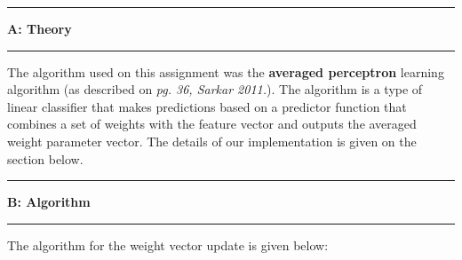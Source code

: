 \documentclass[11pt]{article}
\newcommand\question[2]{\vspace{.25in}\hrule\textbf{#1: #2}\vspace{.5em}\hrule\vspace{.10in}}
\begin{document}
\newcommand\NAME{Turash and Luiz}  %
\newcommand\ID{tmosharr \& lperesde}     %
\newcommand\HWNUM{}              %




\question{A}{Theory} 

The algorithm used on this assignment was the \textbf{averaged perceptron} learning algorithm (as described on \textit{pg. 36, Sarkar 2011.}). The algorithm is a type of linear classifier that makes predictions based on a predictor function that combines a set of weights with the feature vector and outputs the averaged weight parameter vector. The details of our implementation is given on the section below.

\question{B}{Algorithm} 

The algorithm for the weight vector update is given below:		
\end{document}
